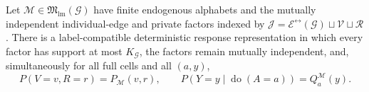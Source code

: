 Let \(\mathcal M\in\mathfrak M_{\mathrm{lm}}(\mathcal G)\) have finite endogenous alphabets and the mutually independent individual-edge and private factors indexed by \(\mathcal J=\mathcal E^{\leftrightarrow}(\mathcal G)\sqcup\mathcal V\sqcup\mathcal R\). There is a label-compatible deterministic response representation in which every factor has support at most \(K_{\mathcal G}\), the factors remain mutually independent, and, simultaneously for all full cells and all \((a,y)\),
\[
P(V=v,R=r)=P_{\mathcal M}(v,r),
\qquad
P(Y=y\mid\operatorname{do}(A=a))=Q_a^{\mathcal M}(y).
\]